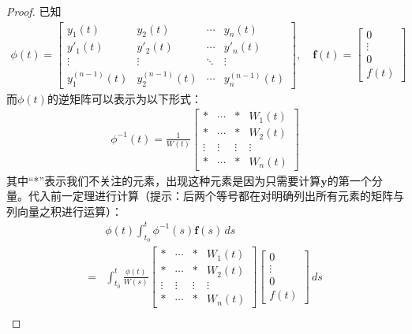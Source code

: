 \begin{proof}
    已知\begin{align*}
        \phi(t)=\begin{bmatrix}
        y_1(t) & y_2(t) & \cdots & y_n(t)\\
        y'_1(t) & y'_2(t) & \cdots & y'_n(t)\\
        \vdots & \vdots & \ddots & \vdots\\
        y_1^{(n-1)}(t) & y_2^{(n-1)}(t) & \cdots & y_n^{(n-1)}(t)
        \end{bmatrix},\quad\mathbf{f}(t)=\begin{bmatrix}
        0\\
        \vdots\\
        0\\
        f(t)
        \end{bmatrix}
    \end{align*}
    而$\phi(t)$的逆矩阵可以表示为以下形式：\begin{align*}
        \phi^{-1}(t)=\frac{1}{W(t)}\begin{bmatrix}
        * & \cdots & * & W_1(t)\\
        * &  \cdots & * & W_2(t)\\
        \vdots & \vdots & \vdots & \vdots\\
        * &  \cdots & * & W_n(t)
        \end{bmatrix}
    \end{align*}
    其中“*”表示我们不关注的元素，出现这种元素是因为只需要计算$\mathbf{y}$的第一个分量。代入前一定理进行计算（提示：后两个等号都在对明确列出所有元素的矩阵与列向量之积进行运算）：\begin{align*}
        &\phi(t)\int_{t_0}^t \phi^{-1}(s)\mathbf{f}(s)\,ds\\
        =&\int_{t_0}^t \frac{\phi(t)}{W(s)}\begin{bmatrix}
        * & \cdots & * & W_1(t)\\
        * &  \cdots & * & W_2(t)\\
        \vdots & \vdots & \vdots & \vdots\\
        * &  \cdots & * & W_n(t)
        \end{bmatrix}\begin{bmatrix}
        0\\
        \vdots\\
        0\\
        f(t)
        \end{bmatrix}\,ds\\

\end{align*}
\end{proof}
